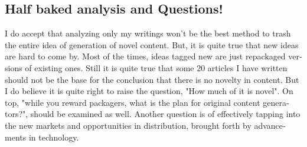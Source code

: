 \begin{english}
\subsection*{Half baked analysis and Questions!}

I do accept that analyzing only my writings won't be the best method to trash the entire idea of generation of novel content. But, it is quite true that new ideas are hard to come by. Most of the times, ideas tagged new are just repackaged versions of existing ones. Still it is quite true that some 20 articles I have written should not be the base for the conclusion that there is no novelty in content. But I do believe it is quite right to raise the question, "How much of it is novel". On top, "while you reward packagers, what is the plan for original content generators?", should be examined as well. Another question is of effectively tapping into the new markets and opportunities in distribution, brought forth by advancements in technology.
\end{english}
\newpage
